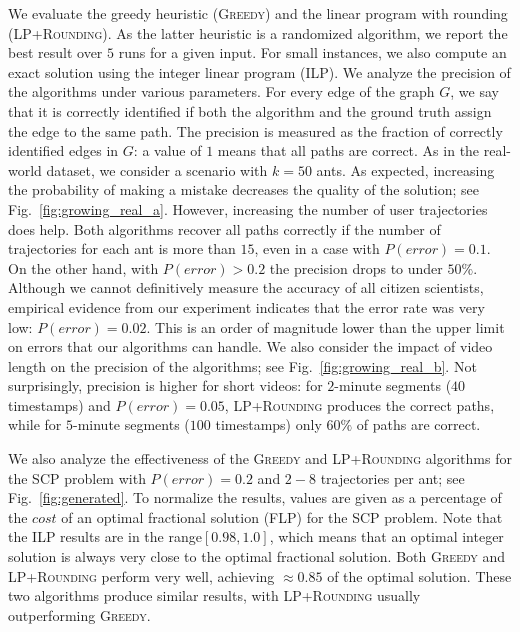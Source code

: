 \documentclass{llncs}
\newcommand{\SCoP}{\textsc{SCP}}
\newcommand{\alg}[1]{\textsc{#1}}
\begin{document}
We evaluate the greedy heuristic (\alg{Greedy}) and
the linear program with rounding (\alg{LP+Rounding}). As the latter
heuristic is a randomized algorithm, we report the best result over $5$ runs
for a given input. For small instances, we also compute
an exact solution using the integer linear program (\alg{ILP}).
We analyze the precision of the algorithms under various parameters. For every edge of the graph $G$,
we say that it is correctly identified if both the algorithm and the ground truth assign the edge to the same path.
The precision is measured as the fraction of correctly identified edges in $G$: a value of $1$ means
that all paths are correct.
As in the real-world dataset, we consider a scenario with $k=50$ ants. As expected, increasing the probability of making a mistake decreases the quality of the solution; see Fig.~\ref{fig:growing_real_a}. However,
increasing the number of user trajectories does help. Both algorithms recover all paths correctly
if the number of trajectories for each ant is more than $15$, even in a case with $P(error)=0.1$. On the other hand,
with $P(error)>0.2$ the precision drops to under $50\%$.
Although we cannot definitively measure the accuracy of all citizen scientists, empirical evidence from  our experiment indicates that the error rate was very low: $P(error) = 0.02$. This is an order of magnitude lower than the upper limit on errors that our algorithms can handle.
We also consider the impact of video length on the precision of the algorithms; see Fig.~\ref{fig:growing_real_b}.
Not surprisingly, precision is higher for short videos: for $2$-minute segments ($40$ timestamps) and $P(error)=0.05$,
\alg{LP+Rounding} produces the correct paths, while for $5$-minute segments ($100$ timestamps) only $60\%$ of paths are correct.

We also analyze the effectiveness of the \alg{Greedy} and \alg{LP+Rounding} algorithms for the \SCoP{} problem
with $P(error)=0.2$ and $2-8$ trajectories per ant;
see Fig.~\ref{fig:generated}.
To normalize the results, values are given as a percentage of the $cost$ of an optimal fractional solution (\alg{FLP}) for the \SCoP{} problem. Note that the \alg{ILP} results are in the range$[0.98,1.0]$, which means that an optimal integer solution is always very close to the optimal fractional solution.
Both \alg{Greedy} and \alg{LP+Rounding} perform very well, achieving $\approx 0.85$ of the optimal solution. These two
algorithms produce similar results, with \alg{LP+Rounding} usually outperforming \alg{Greedy}.
\end{document}
